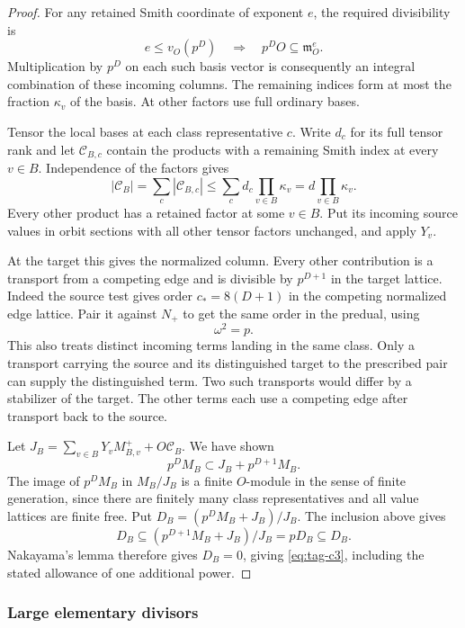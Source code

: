 \begin{proof}
For any retained Smith coordinate of exponent \(e\), the required divisibility is
\[
  e\le v_O(p^D)\quad\Longrightarrow\quad p^DO\subseteq\mathfrak m_O^e .
\]
 Multiplication by
\(p^D\) on each such basis vector is consequently an integral
combination of these incoming columns. The remaining indices form
at most the fraction \(\kappa_v\) of the basis. At other factors
use full ordinary bases.

Tensor the local bases at each class representative \(c\). Write
\(d_c\) for its full tensor rank and let \(\mathcal C_{B,c}\)
contain the products with a remaining Smith index at every
\(v\in B\). Independence of the factors gives
\[
 |\mathcal C_B|=\sum_c|\mathcal C_{B,c}|
          \le \sum_c d_c\prod_{v\in B}\kappa_v
          =d\prod_{v\in B}\kappa_v .
\]
Every other product has a retained factor at some \(v\in B\).
Put its incoming source values in orbit sections with all other tensor factors
unchanged, and apply \(Y_v\).

At the target this gives the normalized
column. Every other contribution is a transport from a competing
edge and is divisible by \(p^{D+1}\) in the target lattice.
Indeed the source test gives order \(c_*=8(D+1)\) in the competing
normalized edge lattice. Pair it against \(N_+\) to get the same
order in the predual, using 
\[
  \omega^2=p.
\]
This also treats distinct incoming terms landing in the same class.
Only a transport carrying the source and its distinguished target
to the prescribed pair can supply the distinguished term. Two such
transports would differ by a stabilizer of the target. The other
terms each use a competing edge after transport back to the source.


Let \(J_B=\sum_{v\in B}Y_vM_{B,v}^{+}+O\mathcal C_B\).
We have shown 
\[
  p^D M_B\subset J_B+p^{D+1}M_B.
\]
The image of \(p^D M_B\) in \(M_B/J_B\) is a finite \(O\)-module
in the sense of finite generation, since there are finitely many
class representatives and all value lattices are finite free.
Put \(D_B=(p^DM_B+J_B)/J_B\). The inclusion above gives
\[
 D_B\subseteq(p^{D+1}M_B+J_B)/J_B=pD_B\subseteq D_B .
\]
Nakayama's lemma therefore gives \(D_B=0\), giving
\eqref{eq:tag-c3}, including the stated allowance of one additional power.

\end{proof}

\subsubsection{Large elementary divisors}

